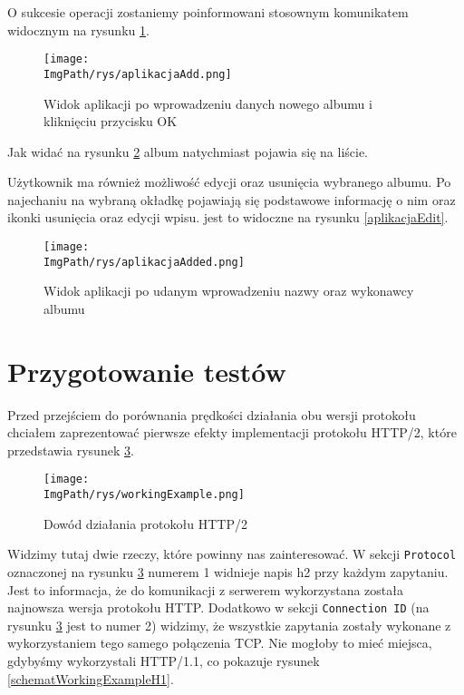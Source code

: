 \documentclass[a4paper,12pt,twoside,openany]{report}
\newcommand{\ImgPath}{.}
\begin{document}
O sukcesie operacji zostaniemy poinformowani stosownym komunikatem widocznym na rysunku \ref{aplikacjaAdd}.

\begin{figure}[!htbp]
	\begin{center}
\centering
\texttt{[image: \\ImgPath/rys/aplikacjaAdd.png]}
\end{center}
	\caption{Widok aplikacji po wprowadzeniu danych nowego albumu i kliknięciu przycisku OK}
	\label{aplikacjaAdd}
\end{figure}

Jak widać na rysunku \ref{aplikacjaAdded} album natychmiast pojawia się na liście.

Użytkownik ma również możliwość edycji oraz usunięcia wybranego albumu. Po najechaniu na wybraną okładkę pojawiają się podstawowe informację o nim oraz ikonki usunięcia oraz edycji wpisu. jest to widoczne na rysunku \ref{aplikacjaEdit}.
\begin{figure}[!htbp]
	\begin{center}
\centering
\texttt{[image: \\ImgPath/rys/aplikacjaAdded.png]}
\end{center}
	\caption{Widok aplikacji po udanym wprowadzeniu nazwy oraz wykonawcy albumu}
	\label{aplikacjaAdded}
\end{figure}

\section{Przygotowanie testów}

Przed przejściem do porównania prędkości działania obu wersji protokołu chciałem zaprezentować pierwsze efekty implementacji protokołu HTTP/2, które przedstawia rysunek \ref{schematWorkingExample}.

\begin{figure}[!htbp]
	\begin{center}
\centering
\texttt{[image: \\ImgPath/rys/workingExample.png]}
\end{center}
	\caption{Dowód działania protokołu HTTP/2}
	\label{schematWorkingExample}
\end{figure}

Widzimy tutaj dwie rzeczy, które powinny nas zainteresować. W sekcji \texttt{Protocol} oznaczonej na rysunku \ref{schematWorkingExample} numerem 1 widnieje napis h2 przy każdym zapytaniu.
Jest to informacja, że do komunikacji z serwerem wykorzystana została najnowsza wersja protokołu HTTP.
Dodatkowo w sekcji \texttt{Connection ID} (na rysunku \ref{schematWorkingExample} jest to numer 2) widzimy, że wszystkie zapytania zostały wykonane z wykorzystaniem tego samego połączenia TCP.
Nie mogłoby to mieć miejsca, gdybyśmy wykorzystali HTTP/1.1, co pokazuje rysunek \ref{schematWorkingExampleH1}.
\end{document}

